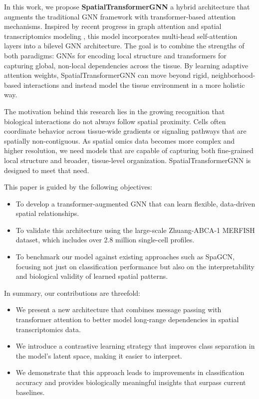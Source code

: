 \documentclass[unnumsec,webpdf,contemporary,medium]{oup-authoring-template}
\begin{document}
In this work, we propose \textbf{SpatialTransformerGNN} a hybrid architecture that augments the traditional GNN framework with transformer-based attention mechanisms. Inspired by recent progress in graph attention and spatial transcriptomics modeling \cite{stagate}, this model incorporates multi-head self-attention layers into a bilevel GNN architecture. The goal is to combine the strengths of both paradigms: GNNs for encoding local structure and transformers for capturing global, non-local dependencies across the tissue. By learning adaptive attention weights, SpatialTransformerGNN can move beyond rigid, neighborhood-based interactions and instead model the tissue environment in a more holistic way.

The motivation behind this research lies in the growing recognition that biological interactions do not always follow spatial proximity. Cells often coordinate behavior across tissue-wide gradients or signaling pathways that are spatially non-contiguous. As spatial omics data becomes more complex and higher resolution, we need models that are capable of capturing both fine-grained local structure and broader, tissue-level organization. SpatialTransformerGNN is designed to meet that need.

This paper is guided by the following objectives:
\begin{itemize}
  \item To develop a transformer-augmented GNN that can learn flexible, data-driven spatial relationships.
  \item To validate this architecture using the large-scale Zhuang-ABCA-1 MERFISH dataset, which includes over 2.8 million single-cell profiles.
  \item To benchmark our model against existing approaches such as SpaGCN, focusing not just on classification performance but also on the interpretability and biological validity of learned spatial patterns.
\end{itemize}

In summary, our contributions are threefold:
\begin{itemize}
  \item We present a new architecture that combines message passing with transformer attention to better model long-range dependencies in spatial transcriptomics data.
  \item We introduce a contrastive learning strategy that improves class separation in the model's latent space, making it easier to interpret.
  \item We demonstrate that this approach leads to improvements in classification accuracy and provides biologically meaningful insights that surpass current baselines.
\end{itemize}
\end{document}
